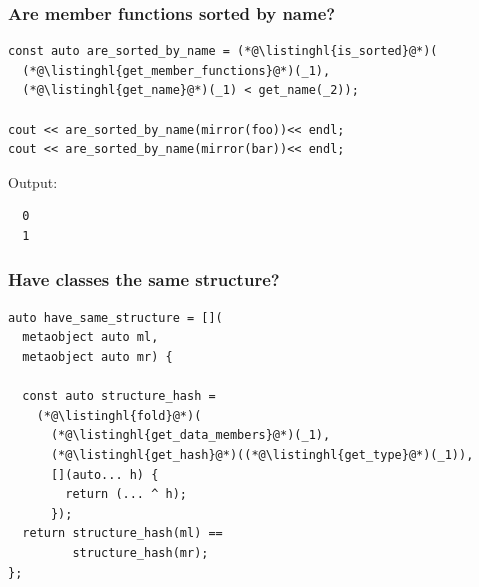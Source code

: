 \documentclass[compress,table,xcolor=table]{beamer}
\begin{document}
\begin{frame}[fragile]
  \frametitle{Are member functions sorted by name?}
  \begin{lstlisting}[language=c++2x,basicstyle=\small\ttfamily]
const auto are_sorted_by_name = (*@\listinghl{is_sorted}@*)(
  (*@\listinghl{get_member_functions}@*)(_1),
  (*@\listinghl{get_name}@*)(_1) < get_name(_2));

cout << are_sorted_by_name(mirror(foo))<< endl;
cout << are_sorted_by_name(mirror(bar))<< endl;
  \end{lstlisting}
  Output:
  \begin{verbatim}
  0
  1
  \end{verbatim}
\end{frame}
\begin{frame}[fragile]
  \frametitle{Have classes the same structure?}
  \begin{lstlisting}[language=c++2x]
auto have_same_structure = [](
  metaobject auto ml,
  metaobject auto mr) {

  const auto structure_hash =
    (*@\listinghl{fold}@*)(
      (*@\listinghl{get_data_members}@*)(_1),
      (*@\listinghl{get_hash}@*)((*@\listinghl{get_type}@*)(_1)),
      [](auto... h) {
        return (... ^ h);
      });
  return structure_hash(ml) ==
         structure_hash(mr);
};
  \end{lstlisting}
\end{frame}
\end{document}
